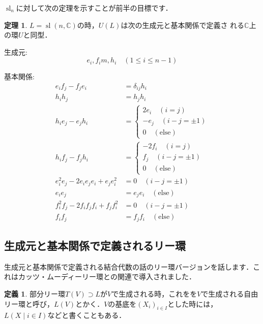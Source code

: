 \documentclass[dvipdfmx,autodetect-engine]{article}
\theoremstyle{definition}
\newtheorem{Def}{定義}
\newtheorem{Th}{定理}
\DeclareMathOperator{\sllie}{sl}
\begin{document}
    $\sllie_n$に対して次の定理を示すことが前半の目標です．
    \begin{Th}
        \label{main1}
        $L = \sllie(n, \mathbb{C})$の時，$U(L)$は次の生成元と基本関係で定義さ
        れる$\mathbb{C}$上の環$U$と同型．
        
        生成元:
        \[
            e_i, f_im, h_i \quad (1 \leq i \leq n-1)
        \]
        
        基本関係:
        \begin{align}
            e_if_j - f_je_i &= \delta_{ij} h_i\\
            h_ih_j  &= h_jh_i\\
            h_ie_j - e_jh_i &= 
            \begin{cases}
                2e_i \quad (i = j)\\
                -e_j \quad (i - j = \pm 1)\\
                0 \quad (\text{else})
            \end{cases}\\
            h_if_j - f_jh_i &= 
            \begin{cases}
                - 2f_i \quad (i = j)\\
                f_j \quad (i - j = \pm 1)\\
                0 \quad (\text{else})
            \end{cases}\\
            e_i^2e_j - 2e_ie_je_i + e_je_i^2 &= 0 \quad (i - j = \pm 1)\\
            e_ie_j &= e_je_i \quad (\text{else})\\
            f_i^2f_j - 2f_if_jf_i + f_jf_i^2 &= 0 \quad (i - j = \pm 1)\\
            f_if_j &= f_jf_i \quad (\text{else})
        \end{align}
    \end{Th}
    
    \subsection{生成元と基本関係で定義されるリー環}
        生成元と基本関係で定義される結合代数の話のリー環バージョンを話します．これはカッツ・ムーディーリー環との関連で導入されました．
        \begin{Def}
            部分リー環$T(V) \supset L$が$V$で生成される時，これをを$V$で生成される自由リー環と呼び，$L(V)$とかく．$V$の基底を$(X_i)_{i \in I}$とした時には，$L(X \mid i \in I)$などと書くこともある．
        \end{Def}
        
\end{document}
